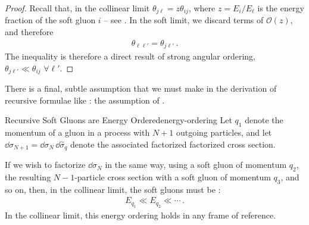 \begin{proof}
    Recall that, in the collinear limit \(\theta_{j \ell} = z \theta_{ij}\), where \(z = E_i / E_\ell\) is the energy fraction of the soft gluon \(i\) -- see .
    In the soft limit, we discard terms of \(\mathcal{O}(z)\), and therefore
    \begin{align}
        \theta_{\ell \ell'} = \theta_{j \ell'}
        \,.
    \end{align}
    The inequality is therefore a direct result of strong angular ordering, \(\theta_{j \ell'} \ll \theta_{ij} \,\, \forall \ell'\).
\end{proof}



There is a final, subtle assumption that we must make in the derivation of recursive formulae like :
%
the assumption of .

\begin{lemma}{Recursive Soft Gluons are Energy Ordered}{energy-ordering}
    Let \(q_1\) denote the momentum of a  gluon in a process with \(N+1\) outgoing particles, and let \(\dd \sigma_{N+1} = \dd\sigma_N \,\dd\overset{\sim}{\sigma}_q\) denote the associated factorized factorized cross section.

    If we wish to factorize \(\dd \sigma_{N}\) in the same way, using a soft gluon of momentum \(q_2\), the resulting \(N-1\)-particle cross section with a soft gluon of momentum \(q_3\), and so on, then, in the collinear limit, the soft gluons must be :
    \begin{align}
        E_{q_1} \ll E_{q_2} \ll \cdots
        \,.
    \end{align}
    In the collinear limit, this energy ordering holds in any frame of reference.
\end{lemma}

